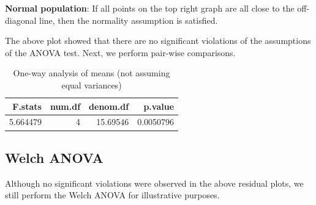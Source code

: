 \documentclass[
]{book}
\newenvironment{Shaded}{\begin{snugshade}}{\end{snugshade}}
\newcommand{\AttributeTok}[1]{\textcolor[rgb]{0.13,0.29,0.53}{#1}}
\newcommand{\DecValTok}[1]{\textcolor[rgb]{0.00,0.00,0.81}{#1}}
\newcommand{\FunctionTok}[1]{\textcolor[rgb]{0.13,0.29,0.53}{\textbf{#1}}}
\newcommand{\NormalTok}[1]{#1}
\newcommand{\OtherTok}[1]{\textcolor[rgb]{0.56,0.35,0.01}{#1}}
\newcommand{\SpecialCharTok}[1]{\textcolor[rgb]{0.81,0.36,0.00}{\textbf{#1}}}
\begin{document}
\textbf{Normal population}: If all points on the top right graph are all close to the off-diagonal line, then the normality assumption is satisfied.

The above plot showed that there are no significant violations of the assumptions of the ANOVA test. Next, we perform pair-wise comparisons.

\begin{Shaded}
\end{Shaded}

\begin{table}

\caption{\label{tab:unnamed-chunk-129}One-way analysis of means (not assuming equal variances)}
\centering
\begin{tabular}[t]{r|r|r|r}
\hline
F.stats & num.df & denom.df & p.value\\
\hline
5.664479 & 4 & 15.69546 & 0.0050796\\
\hline
\end{tabular}
\end{table}

\hypertarget{welch-anova}{%
\subsection{Welch ANOVA}\label{welch-anova}}

Although no significant violations were observed in the above residual plots, we still perform the Welch ANOVA for illustrative purposes.
\end{document}
